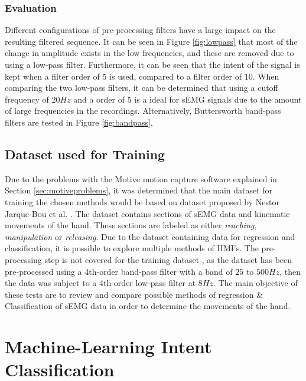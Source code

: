 \documentclass[../main.tex]{subfiles}
\begin{document}
\subsubsection{Evaluation}

Different configurations of pre-processing filters have a large impact on the resulting filtered sequence. 
It can be seen in Figure \ref{fig:lowpass} that most of the change in amplitude exists in the low frequencies, and these are removed due to using a low-pass filter.
Furthermore, it can be seen that the intent of the signal is kept when a filter order of 5 is used, compared to a filter order of 10.
When comparing the two low-pass filters, it can be determined that using a cutoff frequency of $20Hz$ and a order of $5$ is a ideal for sEMG signals due to the amount of large frequencies in the recordings.
Alternatively, Buttersworth band-pass filters are tested in Figure \ref{fig:bandpass},

\subsection{Dataset used for Training}

Due to the problems with the Motive motion capture software explained in Section \ref{sec:motiveproblems}, it was determined that the main dataset for training the chosen methods would be based on dataset \cite{kinmusdataset} proposed by Nestor Jarque-Bou et al. \cite{jarque2019}.
The dataset contains sections of sEMG data and kinematic movements of the hand.
These sections are labeled as either \textit{reaching}, \textit{manipulation} or \textit{releasing}.  
Due to the dataset containing data for regression and classification, it is possible to explore multiple methods of HMI's. 
The pre-processing step is not covered for the training dataset \cite{kinmusdataset}, as the dataset has been pre-processed using a 4th-order band-pass filter with a band of  $25$ to $500Hz$, then the data was subject to a 4th-order low-pass filter at $8 Hz$.
The main objective of these tests are to review and compare possible methods of regression \& Classification of sEMG data in order to determine the movements of the hand.

\section{Machine-Learning Intent Classification}
\label{sec:machine-learning}
\end{document}
